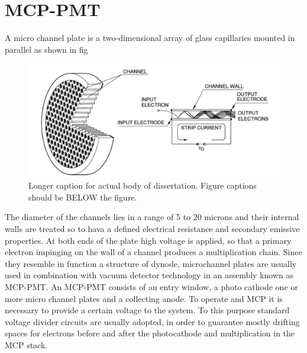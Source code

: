 \section{MCP-PMT}
A micro channel plate is a two-dimensional array of glass capillaries mounted in parallel as shown in fig
\begin{figure}[htbp]
\begin{center}
\includegraphics[width=5in]{../Pictures/Chapter_3/MCP_plate.png}
\end{center}
\caption[Short caption for table of figures.]{Longer caption for actual body
of dissertation.  Figure captions should be BELOW the figure.}
\label{fig:PMT_schematics}
\end{figure}
The diameter of the channels lies in a range of 5 to 20 microns and their internal walls are treated so to hava a defined electrical resistance and secondary emissive properties.
At both ends of the plate high voltage is applied, so that a primary electron impinging on the wall of a channel produces a multiplication chain.
Since they resemble in function a structure of dynode, microchannel plates are usually used in combination with vacuum detector technology in an assembly known as MCP-PMT.
An MCP-PMT consists of an entry window, a photo cathode one or more micro channel plates and a collecting anode.
To operate and MCP it is necessary to provide a certain voltage to the system. To this purpose standard voltage divider circuits are usually adopted, in order to guarantee mostly drifting spaces for electrons before and after the photocathode and multiplication in the MCP stack.
  
